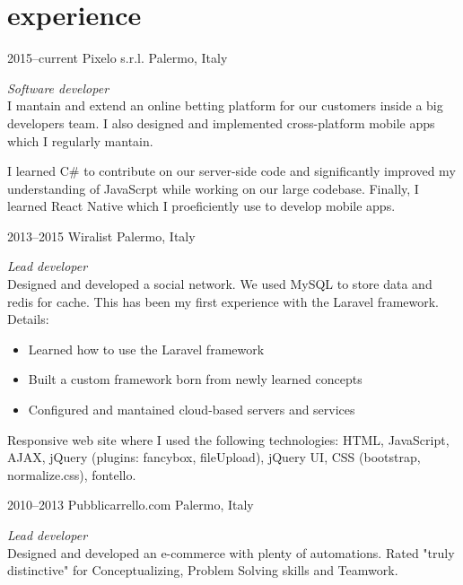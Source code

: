 \documentclass[]{friggeri-cv} %
\begin{document}
\section{experience}
\begin{entrylist}
\entry
{2015--current}
{Pixelo s.r.l.}
{Palermo, Italy}
{\emph{Software developer} \\
I mantain and extend an online betting platform for our customers inside a big
developers team. I also designed and implemented cross-platform mobile apps
which I regularly mantain.

I learned C\# to contribute on our server-side code and significantly improved
my understanding of JavaScrpt while working on our large codebase. Finally, I
learned React Native which I proeficiently use to develop mobile apps.
}
\entry
{2013--2015}
{Wiralist}
{Palermo, Italy}
{\emph{Lead developer} \\
Designed and developed a social network. We used MySQL to store data and redis for cache. This has been my first experience with the Laravel framework. \\
Details:
\begin{itemize}
\item Learned how to use the Laravel framework
\item Built a custom framework born from newly learned concepts
\item Configured and mantained cloud-based servers and services
\end{itemize}

Responsive web site where I used the following technologies: HTML,
JavaScript, AJAX, jQuery (plugins: fancybox, fileUpload), jQuery UI,
CSS (bootstrap, normalize.css), fontello.
}
\entry
{2010--2013}
{Pubblicarrello.com}
{Palermo, Italy}
{\emph{Lead developer} \\
Designed and developed an e-commerce with plenty of automations. Rated "truly distinctive"
for Conceptualizing, Problem Solving skills and Teamwork.

}
\end{entrylist}
\end{document}
